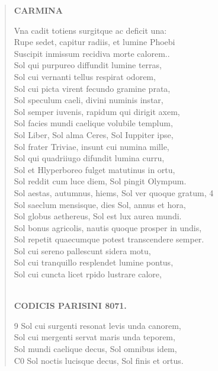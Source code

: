 \documentclass[11pt, a4paper]{report}
\begin{document}
\begin{verse}
     \marginpar{[302]} \begin{center} \textbf{CARMINA} \end{center}Vna cadit totiens surgitque ac deficit una: \\ Rupe sedet, capitur radiis, et lumine Phoebi \\ Suscipit inmissum recidiva morte calorem.. \\ Sol qui purpureo diffundit lumine terras, \\ Sol cui vernanti tellus respirat odorem, \\ Sol cui picta virent fecundo gramine prata, \\ Sol speculum caeli, divini numinis instar, \\ Sol semper iuvenis, rapidum qui dirigit axem, \\ Sol facies mundi caelique volubile templum, \\ Sol Liber, Sol alma Ceres, Sol Iuppiter ipse, \\ Sol frater Triviae, insunt cui numina mille, \\ Sol qui quadriiugo difundit lumina curru, \\ Sol et Hlyperboreo fulget matutinus in ortu, \\ Sol reddit cum luce diem, Sol pingit Olympum. \\ Sol aestas, autumnus, hiems, Sol ver quoque gratum, 4 \\ Sol saeclum mensisque, dies Sol, annus et hora, \\ Sol globus aethereus, Sol est lux aurea mundi. \\ Sol bonus agricolis, nautis quoque prosper in undis, \\ Sol repetit quaecumque potest transcendere semper. \\ Sol cui sereno pallescunt sidera motu, \\ Sol cui tranquillo resplendet lumine pontus, \\ Sol cui cuncta licet rpido lustrare calore, \\ 
        ﻿\pagebreak 
    \begin{center} \textbf{CODICIS PARISINI 8071.} \end{center} \marginpar{[303]} 9 Sol cui surgenti resonat levis unda canorem, \\ Sol cui mergenti servat maris unda teporem, \\ Sol mundi caelique decus, Sol omnibus idem, \\ C0 Sol noctis lucisque decus, Sol finis et ortus. \\ 
      \end{verse}
  
\end{document}
